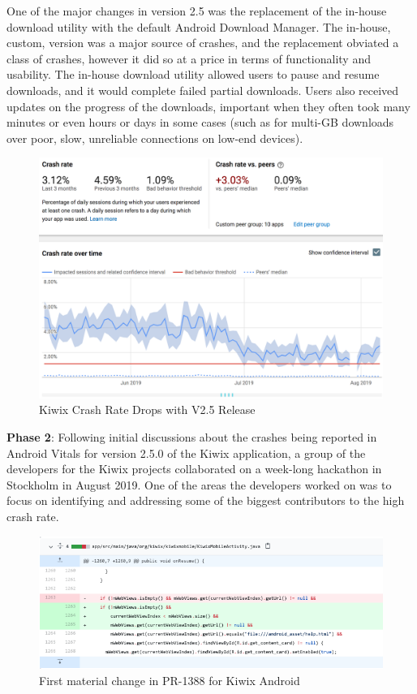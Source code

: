 One of the major changes in version 2.5 was the replacement of the in-house download utility with the default Android Download Manager\cite{kiwix_release_2_5_0}. The in-house, custom, version was a major source of crashes, and the replacement obviated a class of crashes, however it did so at a price in terms of functionality and usability. The in-house download utility allowed users to pause and resume downloads, and it would complete failed partial downloads. Users also received updates on the progress of the downloads, important when they often took many minutes or even hours or days in some cases (such as for multi-GB downloads over poor, slow, unreliable connections on low-end devices).

\begin{figure}[htbp!]
    \centering
    \includegraphics[width=\textwidth]{images/android-vitals-screenshots/kiwix-crash-rate-drops-with-v2_5.png}
    \caption{Kiwix Crash Rate Drops with V2.5 Release}
    \label{fig:kiwix_crash_rate_drops_v2_5}
\end{figure}

\textbf{Phase 2}: Following initial discussions about the crashes being reported in Android Vitals for version 2.5.0 of the Kiwix application, a group of the developers for the Kiwix projects collaborated on a week-long hackathon in Stockholm in August 2019. One of the areas the developers worked on was to focus on identifying and addressing some of the biggest contributors to the high crash rate. 
%

\begin{figure}
    \centering
    \includegraphics[width=14cm]{images/github/kiwix-pr1388-extract-1.png}
    \caption{First material change in PR-1388 for Kiwix Android}
    \label{fig:kiwix_pr1388_extract_1}
\end{figure}


